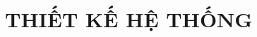 \chapter{THIẾT KẾ HỆ THỐNG}
\label{chap:system-design}

\begingroup
{}

\clearpage

\clearpage

\clearpage

\par
\endgroup
